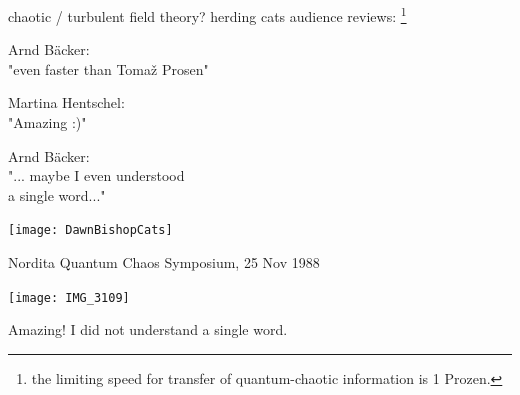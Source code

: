 \renewcommand{\Refl}{\ensuremath{\sigma}}             %
\renewcommand{\shift}{\ensuremath{r}}
\renewcommand{\hopMat}{\shift} %
\renewcommand{\ssp}{\ensuremath{\phi}}             %
\renewcommand{\Xx}{\ensuremath{\mathsf{\Phi}}}      %
\renewcommand{\Ssym}[1]{{\ensuremath{m_{#1}}}}    %


\begin{frame}{chaotic / turbulent field theory?}
herding cats audience reviews:%
\footnote{the limiting speed for transfer of quantum-chaotic information is 1 Prozen.}
\begin{center}
  \begin{minipage}[b]{0.42\textwidth}

\bigskip
Arnd B\"acker: \\ {\footnotesize "even faster than Toma\v{z} Prosen"}

\bigskip
Martina Hentschel: \\ {\footnotesize "Amazing :)"}

\bigskip
Arnd B\"acker: \\ {\footnotesize "... maybe  I even understood \\ a single word..."}
  \end{minipage}
\qquad\quad
  \begin{minipage}[b]{0.46\textwidth}\hfill
\texttt{[image: DawnBishopCats]}
  \end{minipage}
\end{center}
\end{frame} %

\begin{frame}{Nordita Quantum Chaos Symposium, 25 Nov 1988}
\begin{center}
\hfill\texttt{[image: IMG\_3109]}
\end{center}

\begin{bartlett}
     Amazing! I did not understand a single word.
\end{bartlett}
\end{frame} %

\begin{frame}
  \titlepage
\end{frame} %

